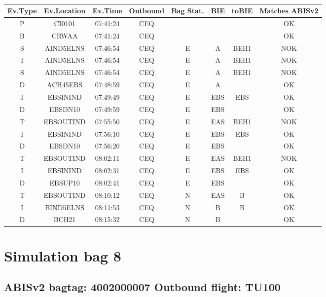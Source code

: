 \documentclass{report}
\begin{document}
\paragraph{}
\begin{longtable}{cccccccc}    \toprule
\rowcolor{white!50}
\textbf{Ev.Type} & \textbf{Ev.Location} & \textbf{Ev.Time} & \textbf{Outbound} & \textbf{Bag Stat.} & \textbf{BIE} & \textbf{toBIE} & \textbf{Matches ABISv2} \\\midrule
P & CI0101 & 07:41:24  & CEQ &  &  &  & OK\\
B & CRWAA & 07:41:24  & CEQ &  &  &  & OK\\
S & AIND5ELNS & 07:46:54  & CEQ & E & A & BEH1 & NOK\\
I & AIND5ELNS & 07:46:54  & CEQ & E & A & BEH1 & NOK\\
S & AIND5ELNS & 07:46:54  & CEQ & E & A & BEH1 & NOK\\
D & ACH45EBS & 07:48:59  & CEQ & E & A &  & OK\\
I & EBSININD & 07:49:49  & CEQ & E & EBS & EBS & OK\\
D & EBSDN10 & 07:49:59  & CEQ & E & EBS &  & OK\\
T & EBSOUTIND & 07:55:50  & CEQ & E & EAS & BEH1 & NOK\\
I & EBSININD & 07:56:10  & CEQ & E & EBS & EBS & OK\\
D & EBSDN10 & 07:56:20  & CEQ & E & EBS &  & OK\\
T & EBSOUTIND & 08:02:11  & CEQ & E & EAS & BEH1 & NOK\\
I & EBSININD & 08:02:31  & CEQ & E & EBS & EBS & OK\\
D & EBSUP10 & 08:02:41  & CEQ & E & EBS &  & OK\\
T & EBSOUTIND & 08:10:12  & CEQ & N & EAS & B & OK\\
I & BIND5ELNS & 08:11:53  & CEQ & N & B & B & OK\\
D & BCH21 & 08:15:32  & CEQ & N & B &  & OK\\
\bottomrule
\end{longtable}
\pagebreak
\section*{Simulation bag 8}
\subsection*{ABISv2 bagtag: 4002000007 Outbound flight: TU100}
\end{document}
